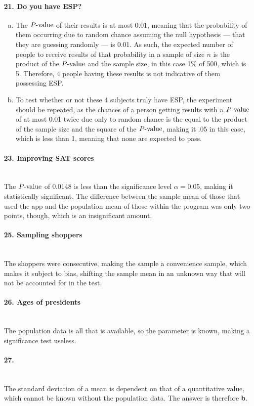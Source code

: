 \documentclass[../Homework]{subfiles}
\begin{document}
		\paragraph{21. Do you have ESP?}
			\begin{enumerate}[a.]
				\item
					The $P\text{-value}$ of their results is at most 0.01, meaning that the probability of them occurring due to random chance assuming the null hypothesis --- that they are guessing randomly --- is 0.01. As such, the expected number of people to receive results of that probability in a sample of size $n$ is the product of the $P\text{-value}$ and the sample size, in this case 1\% of 500, which is 5. Therefore, 4 people having these results is not indicative of them possessing ESP.
				\item
					To test whether or not these 4 subjects truly have ESP, the experiment should be repeated, as the chances of a person getting results with a $P\text{-value}$ of at most 0.01 twice due only to random chance is the equal to the product of the sample size and the square of the $P\text{-value}$, making it .05 in this case, which is less than 1, meaning that none are expected to pass.
			\end{enumerate}
		\paragraph{23. Improving SAT scores}\ \\
			The $P\text{-value}$ of 0.0148 is less than the significance level $\alpha = 0.05$, making it statistically significant. The difference between the sample mean of those that used the app and the population mean of those within the program was only two points, though, which is an insignificant amount.
		\paragraph{25. Sampling shoppers}\ \\
			The shoppers were consecutive, making the sample a convenience sample, which makes it subject to bias, shifting the sample mean in an unknown way that will not be accounted for in the test.
		\paragraph{26. Ages of presidents}\ \\
			The population data is all that is available, so the parameter is known, making a significance test useless.
		\paragraph{27.}\ \\
			The standard deviation of a mean is dependent on that of a quantitative value, which cannot be known without the population data. The answer is therefore \textbf{b}.
\end{document}
